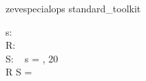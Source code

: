 \begin{zsection}
   \SECTION zevespecialops \parents standard\_toolkit
\end{zsection}

\begin{axdef}
   s: \seq~\nat \\
   R: \nat \rel \nat \\
   S: \power~\nat
\where
   s = , 20 \rangle \\
   R \limg S \rimg = \emptyset
\end{axdef}